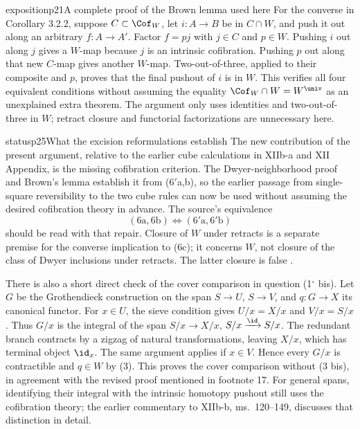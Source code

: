 \begin{dcomment}{exposition}{p21}{A complete proof of the Brown lemma used here}
For the converse in Corollary 3.2.2, suppose $C\subset\Cof_W$, let $i:A\to B$ be in $C\cap W$, and push it out along an arbitrary $f:A\to A'$. Factor $f=pj$ with $j\in C$ and $p\in W$. Pushing $i$ out along $j$ gives a $W$-map because $j$ is an intrinsic cofibration. Pushing $p$ out along that new $C$-map gives another $W$-map. Two-out-of-three, applied to their composite and $p$, proves that the final pushout of $i$ is in $W$. This verifies all four equivalent conditions without assuming the equality $\Cof_W\cap W=W^{\univ}$ as an unexplained extra theorem. The argument only uses identities and two-out-of-three in $W$; retract closure and functorial factorizations are unnecessary here.
\end{dcomment}

\begin{dcomment}{status}{p25}{What the excision reformulations establish}
The new contribution of the present argument, relative to the earlier cube calculations in XIIb-a and XII Appendix, is the missing cofibration criterion. The Dwyer-neighborhood proof and Brown's lemma establish it from (6$'$a,b), so the earlier passage from single-square reversibility to the two cube rules can now be used without assuming the desired cofibration theory in advance. The source's equivalence
\[
(6\mathrm{a},6\mathrm{b})\Longleftrightarrow(6'\mathrm{a},6'\mathrm{b})
\]
should be read with that repair. Closure of $W$ under retracts is a separate premise for the converse implication to (6c); it concerns $W$, not closure of the class of Dwyer inclusions under retracts. The latter closure is false \citep[pp.~228--229]{Cisinski1999Dwyer}.

There is also a short direct check of the cover comparison in question (1$^\circ$ bis). Let $G$ be the Grothendieck construction on the span $S\to U$, $S\to V$, and $q:G\to X$ its canonical functor. For $x\in U$, the sieve condition gives $U/x=X/x$ and $V/x=S/x$. Thus $G/x$ is the integral of the span $S/x\to X/x$, $S/x\xrightarrow{\id}S/x$. The redundant branch contracts by a zigzag of natural transformations, leaving $X/x$, which has terminal object $\id_x$. The same argument applies if $x\in V$. Hence every $G/x$ is contractible and $q\in W$ by (3). This proves the cover comparison without (3 bis), in agreement with the revised proof mentioned in footnote 17. For general spans, identifying their integral with the intrinsic homotopy pushout still uses the cofibration theory; the earlier commentary to XIIb-b, ms.~120--149, discusses that distinction in detail.


\end{dcomment}
